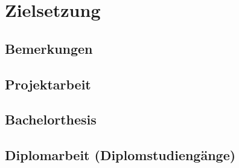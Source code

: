 \chapter{Zielsetzung}
\label{zielsetzung}
\section{Bemerkungen}
\label{zielsetzung-bemerkungen}

\section{Projektarbeit}
\label{zielsetzung-projektarbeit}

\section{Bachelorthesis}
\label{zielsetzung-bachelorthesis}

\section{Diplomarbeit (Diplomstudiengänge)}
\label{zielsetzung-diplomarbeit}
